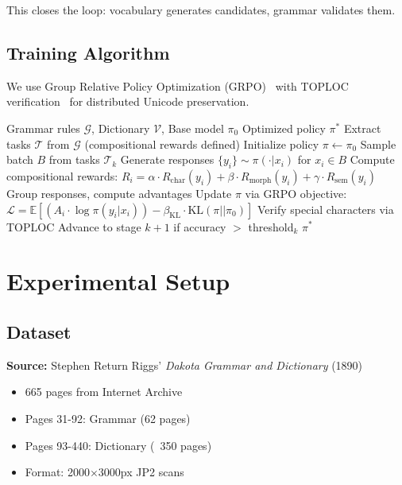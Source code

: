 \documentclass{article}
\newcommand{\EE}{\mathbb{E}}
\newcommand{\Rchar}{R_{\text{char}}}
\newcommand{\Rmorph}{R_{\text{morph}}}
\newcommand{\Rsem}{R_{\text{sem}}}
\begin{document}
This closes the loop: vocabulary generates candidates, grammar validates them.

\subsection{Training Algorithm}

We use Group Relative Policy Optimization (GRPO)~\cite{shao2024deepseekmath} with TOPLOC verification~\cite{primeintellect2024} for distributed Unicode preservation.

\begin{algorithm}[t]
\caption{DakotaGrammarRL Training}
\label{alg:dakota_rl}
\begin{algorithmic}[1]
\REQUIRE Grammar rules $\mathcal{G}$, Dictionary $\mathcal{V}$, Base model $\pi_0$
\ENSURE Optimized policy $\pi^*$
\STATE Extract tasks $\mathcal{T}$ from $\mathcal{G}$ (compositional rewards defined)
\STATE Initialize policy $\pi \leftarrow \pi_0$
        \STATE Sample batch $B$ from tasks $\mathcal{T}_k$
        \STATE Generate responses $\{y_i\} \sim \pi(\cdot|x_i)$ for $x_i \in B$
        \STATE Compute compositional rewards:
        \STATE \quad $R_i = \alpha \cdot \Rchar(y_i) + \beta \cdot \Rmorph(y_i) + \gamma \cdot \Rsem(y_i)$
        \STATE Group responses, compute advantages
        \STATE Update $\pi$ via GRPO objective:
        \STATE \quad $\mathcal{L} = \EE[(A_i \cdot \log \pi(y_i|x_i)) - \beta_{\text{KL}} \cdot \text{KL}(\pi||\pi_0)]$
        \STATE Verify special characters via TOPLOC
    \ENDFOR
    \STATE Advance to stage $k+1$ if accuracy $>$ threshold$_k$
\ENDFOR
\RETURN $\pi^*$
\end{algorithmic}
\end{algorithm}

\section{Experimental Setup}

\subsection{Dataset}

\textbf{Source:} Stephen Return Riggs' \textit{Dakota Grammar and Dictionary} (1890)
\begin{itemize}
    \item 665 pages from Internet Archive
    \item Pages 31-92: Grammar (62 pages)
    \item Pages 93-440: Dictionary (~350 pages)
    \item Format: 2000$\times$3000px JP2 scans
\end{itemize}
\end{document}
